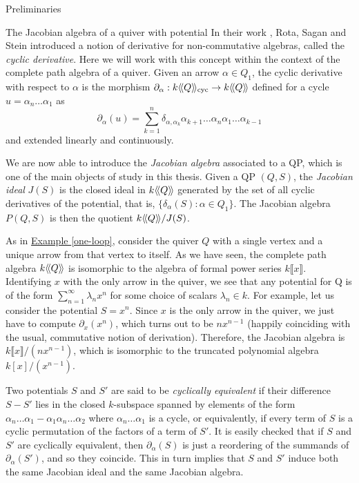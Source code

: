 \begin{chapter}{Preliminaries}
\begin{section}{The Jacobian algebra of a quiver with potential}
In their work \cite{RSS80}, Rota, Sagan and Stein introduced a notion of derivative for non-commutative algebras, called the \emph{cyclic derivative}. Here we will work with this concept within the context of the complete path algebra of a quiver. Given an arrow $\alpha\in Q_1$, the cyclic derivative with respect to $\alpha$ is the morphism $\partial_\alpha:k\langle\!\langle Q\rangle\!\rangle_{\mathrm{cyc}}\to k\langle\!\langle Q\rangle\!\rangle$ defined for a cycle $u=\alpha_n\dots\alpha_1$ as
\[
\partial_\alpha(u) = \sum_{k=1}^n \delta_{\alpha, \alpha_k}\alpha_{k+1}\dots\alpha_n\alpha_1\dots\alpha_{k-1}
\]
and extended linearly and continuously.

We are now able to introduce the \emph{Jacobian algebra} associated to a QP, which is one of the main objects of study in this thesis. Given a QP $(Q,S)$, the \emph{Jacobian ideal} $J(S)$ is the closed ideal in $k\langle\!\langle Q\rangle\!\rangle$ generated by the set of all cyclic derivatives of the potential, that is, $\{\delta_\alpha(S) : \alpha\in Q_1\}$. The Jacobian algebra $P(Q,S)$ is then the quotient $k\langle\!\langle Q\rangle\!\rangle/J(S)$.

\begin{exmp} As in \hyperref[one-loop]{Example \ref*{one-loop}}, consider the quiver $Q$ with a single vertex and a unique arrow from that vertex to itself. As we have seen, the complete path algebra $k\langle\!\langle Q\rangle\!\rangle$ is isomorphic to the algebra of formal power series $k\llbracket x\rrbracket$. Identifying $x$ with the only arrow in the quiver, we see that any potential for Q is of the form $\sum_{n=1}^\infty \lambda_n x^n$ for some choice of scalars $\lambda_n\in k$. For example, let us consider the potential $S=x^n$. Since $x$ is the only arrow in the quiver, we just have to compute $\partial_x(x^n)$, which turns out to be $nx^{n-1}$ (happily coinciding with the usual, commutative notion of derivation). Therefore, the Jacobian algebra is $k\llbracket x\rrbracket/(nx^{n-1})$, which is isomorphic to the truncated polynomial algebra $k[x]/(x^{n-1})$.
\end{exmp}

Two potentials $S$ and $S'$ are said to be \emph{cyclically equivalent} if their difference $S-S'$ lies in the closed $k$-subspace spanned by elements of the form $\alpha_n\dots\alpha_1 - \alpha_1\alpha_n\dots\alpha_2$ where $\alpha_n\dots\alpha_1$ is a cycle, or equivalently, if every term of $S$ is a cyclic permutation of the factors of a term of $S'$. It is easily checked that if $S$ and $S'$ are cyclically equivalent, then $\partial_\alpha(S)$ is just a reordering of the summands of $\partial_\alpha(S')$, and so they coincide. This in turn implies that $S$ and $S'$ induce both the same Jacobian ideal and the same Jacobian algebra.


\end{section}
\end{chapter}
